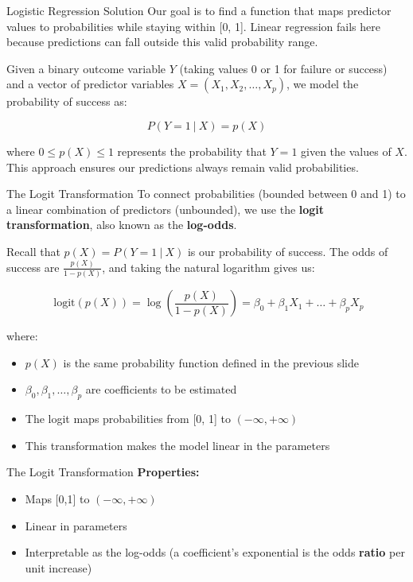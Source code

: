 \documentclass[aspectratio=169,ignorenonframetext]{beamer}
\begin{document}
\begin{frame}{Logistic Regression Solution}
Our goal is to find a function that maps predictor values to
probabilities while staying within {[}0, 1{]}. Linear regression fails
here because predictions can fall outside this valid probability range.

Given a binary outcome variable \(Y\) (taking values 0 or 1 for failure
or success) and a vector of predictor variables
\(X = \left( X_{1},X_{2},\ldots,X_{p} \right)\), we model the
probability of success as:

\[P\left( Y = 1~|~X \right) = p(X)\]

where \(0 \leq p(X) \leq 1\) represents the probability that \(Y = 1\)
given the values of \(X\). This approach ensures our predictions always
remain valid probabilities.
\end{frame}

\begin{frame}{The Logit Transformation}
To connect probabilities (bounded between 0 and 1) to a linear
combination of predictors (unbounded), we use the \textbf{logit
transformation}, also known as the \textbf{log-odds}.

Recall that \(p(X) = P\left( Y = 1~|~X \right)\) is our probability of
success. The odds of success are \(\frac{p(X)}{1 - p(X)}\), and taking
the natural logarithm gives us:

\[\text{ logit}\left( p(X) \right) = \log(\frac{p(X)}{1 - p(X)}) = \beta_{0} + \beta_{1}X_{1} + \ldots + \beta_{p}X_{p}\]

where:

\begin{itemize}
\item
  \(p(X)\) is the same probability function defined in the previous
  slide
\item
  \(\beta_{0},\beta_{1},\ldots,\beta_{p}\) are coefficients to be
  estimated
\item
  The logit maps probabilities from {[}0, 1{]} to
  \(( - \infty, + \infty)\)
\item
  This transformation makes the model linear in the parameters
\end{itemize}
\end{frame}

\begin{frame}{The Logit Transformation}
\textbf{Properties:}

\begin{itemize}
\item
  Maps {[}0,1{]} to \(( - \infty, + \infty)\)
\item
  Linear in parameters
\item
  Interpretable as the log-odds (a coefficient's exponential is the odds
  \textbf{ratio} per unit increase)
\end{itemize}
\end{frame}
\end{document}
